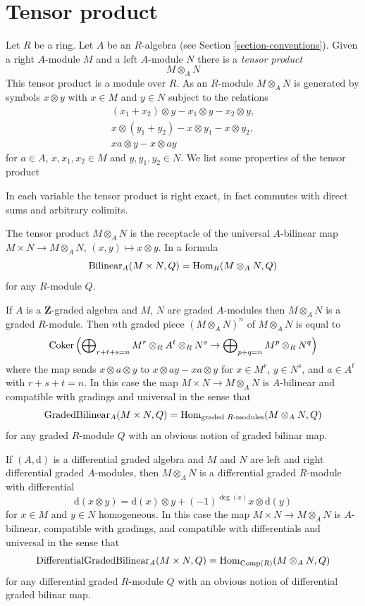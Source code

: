 \section{Tensor product}
\label{section-tensor-product}

\noindent
Let $R$ be a ring. Let $A$ be an $R$-algebra (see
Section \ref{section-conventions}). Given a right $A$-module $M$
and a left $A$-module $N$ there is a {\it tensor product}
$$
M \otimes_A N
$$
This tensor product is a module over $R$. As an $R$-module $M \otimes_A N$
is generated by symbols $x \otimes y$ with $x \in M$ and $y \in N$ subject
to the relations
$$
\begin{matrix}
(x_1 + x_2) \otimes y - x_1 \otimes y - x_2 \otimes y, \\
x \otimes (y_1 + y_2) - x \otimes y_1 - x \otimes y_2, \\
xa \otimes y - x \otimes ay
\end{matrix}
$$
for $a \in A$, $x, x_1, x_2 \in M$ and $y, y_1, y_2 \in N$.
We list some properties of the tensor product

\medskip\noindent
In each variable the tensor product is right exact, in fact commutes
with direct sums and arbitrary colimits.

\medskip\noindent
The tensor product $M \otimes_A N$ is the receptacle of the universal
$A$-bilinear map $M \times N \to M \otimes_A N$, $(x, y) \mapsto x \otimes y$.
In a formula
$$
\text{Bilinear}_A(M \times N, Q) = \mathop{\mathrm{Hom}}\nolimits_R(M \otimes_A N, Q)
$$
for any $R$-module $Q$.

\medskip\noindent
If $A$ is a $\mathbf{Z}$-graded algebra and $M$, $N$ are graded
$A$-modules then $M \otimes_A N$ is a graded $R$-module.
Then $n$th graded piece $(M \otimes_A N)^n$ of $M \otimes_A N$
is equal to
$$
\mathop{\mathrm{Coker}}\left(
\bigoplus\nolimits_{r + t + s = n}
M^r \otimes_R A^t \otimes_R N^s \to
\bigoplus\nolimits_{p + q = n} M^p \otimes_R N^q
\right)
$$
where the map sends $x \otimes a \otimes y$ to
$x \otimes ay - xa \otimes y$ for
$x \in M^r$, $y \in N^s$, and $a \in A^t$ with $r + s + t = n$.
In this case the map $M \times N \to M \otimes_A N$ is $A$-bilinear
and compatible with gradings and universal in the sense that
$$
\text{GradedBilinear}_A(M \times N, Q) =
\mathop{\mathrm{Hom}}\nolimits_{\text{graded }R\text{-modules}}(M \otimes_A N, Q)
$$
for any graded $R$-module $Q$ with an obvious notion of graded
bilinar map.

\medskip\noindent
If $(A, \text{d})$ is a differential graded algebra and
$M$ and $N$ are left and right differential graded $A$-modules, then
$M \otimes_A N$ is a differential graded $R$-module with differential
$$
\text{d}(x \otimes y) =
\text{d}(x) \otimes y + (-1)^{\deg(x)}x \otimes \text{d}(y)
$$
for $x \in M$ and $y \in N$ homogeneous. In this case the map
$M \times N \to M \otimes_A N$ is $A$-bilinear, compatible with gradings,
and compatible with differentials and universal in the sense that
$$
\text{DifferentialGradedBilinear}_A(M \times N, Q) =
\mathop{\mathrm{Hom}}\nolimits_{\text{Comp}(R)}(M \otimes_A N, Q)
$$
for any differential graded $R$-module $Q$ with an obvious notion of
differential graded bilinar map.






